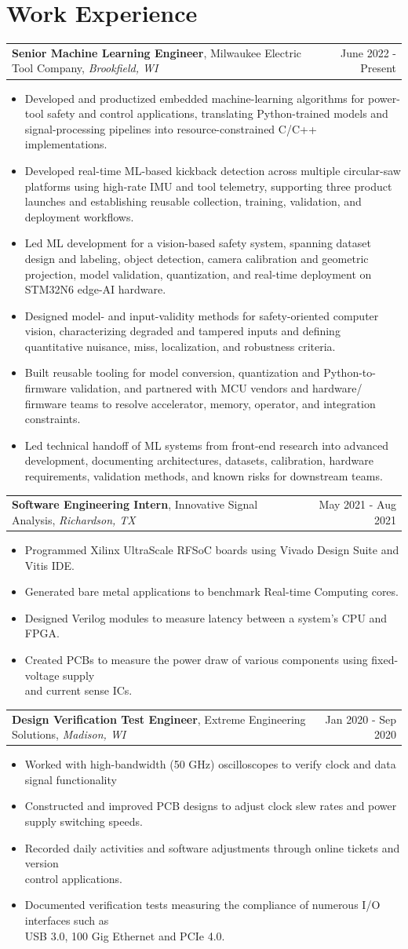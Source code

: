 \documentclass[letterpaper,11pt]{article}
\makeatletter
\newcommand{\exptitle}[4]{
  \vspace{7pt}
  \begin{tabular*}{1.00\textwidth}[t]{l@{\extracolsep{\fill}}r}
    \textbf{#1}, #2, \textit{#3} & #4 \\
  \end{tabular*}\vspace{-5pt}
}
\newcommand{\expstart}{\begin{itemize}[leftmargin=5mm]}
\newcommand{\expend}{\end{itemize}\vspace{-5pt}}
\newcommand{\expitem}[1]{\item\small{{#1 \vspace{-5pt}}}}
\makeatother
\begin{document}
\section{Work 
Experience}
 \vspace{-6pt}
\exptitle{Senior Machine Learning Engineer}{Milwaukee Electric Tool Company} {Brookfield, WI}{June 2022 - Present} 
  \expstart 
    \expitem{Developed and productized embedded machine-learning algorithms for power-tool safety and control applications, translating Python-trained models and signal-processing pipelines into resource-constrained C/C++ implementations.} 
    \expitem{Developed real-time ML-based kickback detection across multiple circular-saw platforms using high-rate IMU and tool telemetry, supporting three product launches and establishing reusable collection, training, validation, and deployment workflows.} 
    \expitem{Led ML development for a vision-based safety system, spanning dataset design and labeling, object detection, camera calibration and geometric projection, model validation, quantization, and real-time deployment on STM32N6 edge-AI hardware.} 
    \expitem{Designed model- and input-validity methods for safety-oriented computer vision, characterizing degraded and tampered inputs and defining quantitative nuisance, miss, localization, and robustness criteria.} 
    \expitem{Built reusable tooling for model conversion, quantization and Python-to-firmware validation, and partnered with MCU vendors and hardware/ firmware teams to resolve accelerator, memory, operator, and integration constraints.} 
    \expitem{Led technical handoff of ML systems from front-end research into advanced development, documenting architectures, datasets, calibration, hardware requirements, validation methods, and known risks for downstream teams.} 
  \expend

  \exptitle{Software Engineering Intern}{Innovative Signal Analysis}{Richardson, TX}{May 2021 - Aug 2021}
  \expstart
    \expitem{Programmed Xilinx UltraScale RFSoC boards using Vivado Design Suite and Vitis IDE.}
    \expitem{Generated bare metal applications to benchmark Real-time Computing cores.}
    \expitem{Designed Verilog modules to measure latency between a system’s CPU and FPGA.}
    \expitem{Created PCBs to measure the power draw of various components using fixed-voltage supply \\ and current sense ICs.}
  \expend
  
  \exptitle{Design Verification Test Engineer}{Extreme Engineering Solutions}{Madison, WI}{Jan 2020 - Sep 2020}
  \expstart
    \expitem{Worked with high-bandwidth (50 GHz) oscilloscopes to verify clock and data signal functionality}
    \expitem{Constructed and improved PCB designs to adjust clock slew rates and power supply switching speeds.}
    \expitem{Recorded daily activities and software adjustments through online tickets and version \\ control applications.}
    \expitem{Documented verification tests measuring the compliance of numerous I/O interfaces such as \\ USB 3.0, 100 Gig Ethernet and PCIe 4.0.}
  \expend
  
\end{document}

